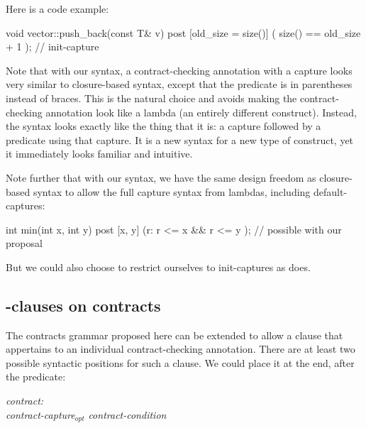 Here is a code example:

\vspace{2mm}
\begin{codeblock}
void vector::push_back(const T& v)
  post [old_size = size()] ( size() == old_size + 1 );  // init-capture
\end{codeblock}
\vspace{2mm}

Note that with our syntax, a contract-checking annotation with a capture looks very similar to closure-based syntax, except that the predicate is in parentheses instead of braces. This is the natural choice and avoids making the contract-checking annotation look like a lambda (an entirely different construct). Instead, the syntax looks exactly like the thing that it is: a capture followed by a predicate using that capture. It is a new syntax for a new type of construct, yet it immediately looks familiar and intuitive.

Note further that with our syntax, we have the same design freedom as closure-based syntax \cite{P2461R1} to allow the full capture syntax from lambdas, including default-captures:

\vspace{2mm}
\begin{codeblock}
int min(int x, int y)
  post [x, y] (r: r <= x && r <= y );   // possible with our proposal
\end{codeblock}
\vspace{2mm}

But we could also choose to restrict ourselves to init-captures as \cite{P2935R0} does. 


\subsection{-clauses on contracts}
\label{subsec:requires}

The contracts grammar proposed here can be extended to allow a  clause that appertains to an individual contract-checking annotation. There are at least two possible syntactic positions for such a  clause. We could place it at the end, after the predicate:

\begin{adjustwidth}{0.5cm}{0.5cm}
\emph{contract:} \\
\phantom{~~~}\emph{contract-capture}$_{opt}$ \emph{contract-condition} 

\end{adjustwidth}

